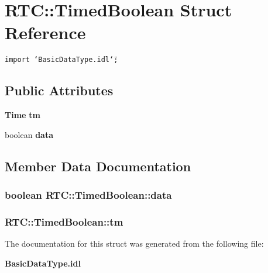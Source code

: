 \section{RTC::Timed\-Boolean Struct Reference}
\label{structRTC_1_1TimedBoolean}
{\tt import \char`\"{}Basic\-Data\-Type.idl\char`\"{};}

\subsection*{Public Attributes}
\begin{CompactItemize}
\item 
{\bf Time} {\bf tm}
\item 
boolean {\bf data}
\end{CompactItemize}


\subsection{Member Data Documentation}
\subsubsection{\setlength{\rightskip}{0pt plus 5cm}boolean {\bf RTC::Timed\-Boolean::data}}\label{structRTC_1_1TimedBoolean_RTC_1_1TimedBooleano1}


\subsubsection{ {\bf RTC::Timed\-Boolean::tm}}\label{structRTC_1_1TimedBoolean_RTC_1_1TimedBooleano0}




The documentation for this struct was generated from the following file:\begin{CompactItemize}
\item 
{\bf Basic\-Data\-Type.idl}\end{CompactItemize}
